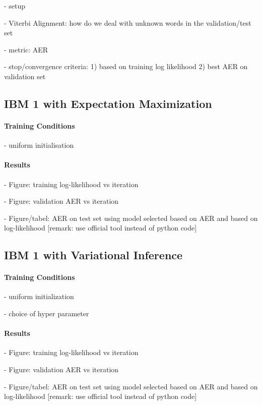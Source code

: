 \documentclass[11pt,a4paper]{article}
\begin{document}
- setup

- Viterbi Alignment: how do we deal with unknown words in the validation/test set

- metric: AER

- stop/convergence criteria:
1) based on training log likelihood
2) best AER on validation set


\subsection{IBM 1 with Expectation Maximization}
\label{IBM1}


\paragraph{Training Conditions}

- uniform initialisation

\paragraph{Results}

- Figure: training log-likelihood vs iteration

- Figure: validation AER vs iteration

- Figure/tabel: AER on test set using model selected based on AER and based on log-likelihood [remark: use official tool instead of python code]  


\subsection{IBM 1 with Variational Inference}
\label{IBM1_Dirichlet}


\paragraph{Training Conditions}

- uniform initialization

- choice of hyper parameter

\paragraph{Results}

- Figure: training log-likelihood vs iteration

- Figure: validation AER vs iteration

- Figure/tabel: AER on test set using model selected based on AER and based on log-likelihood [remark: use official tool instead of python code]  
\end{document}
